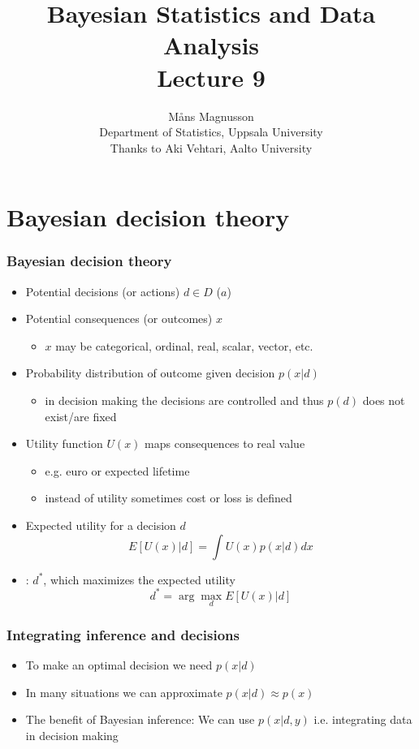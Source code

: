 \documentclass[10pt]{beamer}
\title[]{{\color{black}Bayesian Statistics and Data Analysis \\ Lecture 9}}
\author[]{M{\aa}ns Magnusson \\ Department of Statistics, Uppsala University \\ Thanks to Aki Vehtari, Aalto University}
\date{}
\begin{document}
\frame{\titlepage
}



\section{Bayesian decision theory}
\frame{\sectionpage}


\begin{frame}

\frametitle{Bayesian decision theory}

  \begin{itemize}
  \item<+-> Potential decisions (or actions) $d \in D$ ($a$)
  \pause
  \item<+-> Potential consequences (or outcomes) $x$
    \begin{itemize}
      \item $x$ may be categorical, ordinal, real, scalar, vector, etc.
    \end{itemize}
    \pause
  \item<+-> Probability distribution of outcome given decision $p(x|d)$
    \begin{itemize}
    \item in decision making the decisions are controlled and thus $p(d)$ does not exist/are fixed
    \end{itemize}
    \pause
  \item<+->  Utility function $U(x)$ maps consequences to real value
    \begin{itemize}
      \item e.g. euro or expected lifetime
      \item instead of utility sometimes cost or loss is defined
    \end{itemize}
  \pause
  \item<+-> Expected utility for a decision $d$
  \[
  E[U(x)|d]=\int U(x) p(x|d) dx
  \]
  \pause
  \item<+-> : $d^*$, which maximizes the expected utility
    \begin{equation*}
      d^*=\arg\max_d E[U(x)|d]
    \end{equation*}
  \end{itemize}

\end{frame}

\begin{frame}

\frametitle{Integrating inference and decisions}

  \begin{itemize}
    \item<+-> To make an optimal decision we need $p(x|d)$
    \pause
    \item<+-> In many situations we can approximate $p(x|d) \approx p(x)$
    \pause
    \item<+-> The benefit of Bayesian inference: We can use $p(x|d, y)$ i.e. integrating data in decision making
  \end{itemize}

\end{frame}
\end{document}
